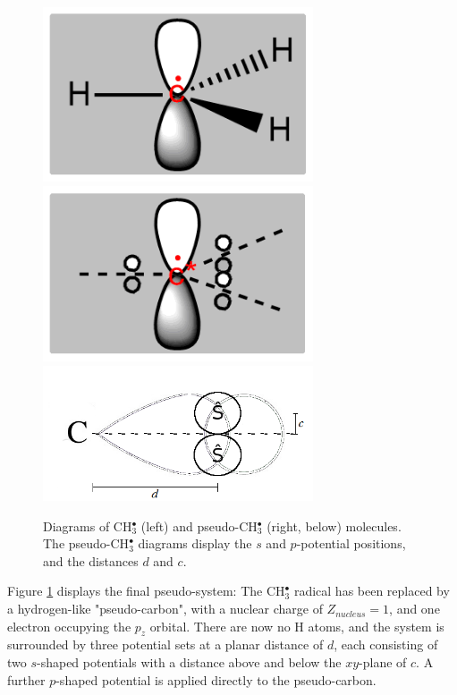 \documentclass[journal=jctcce,manuscript=article]{achemso}
\begin{document}
\begin{figure}[ht]
\includegraphics[width=8cm]{ch3.png}
\includegraphics[width=8cm]{pseudoch3.png}
\includegraphics[width=8cm]{tm_sp2_potentials.png}
\caption{Diagrams of CH\(^{\bullet}_{3}\) (left) and pseudo-CH\(^{\bullet}_{3}\) (right, below) molecules. The pseudo-CH\(^{\bullet}_{3}\) diagrams display the \(s\) and \(p\)-potential positions, and the distances \(d\) and \(c\).}
\label{figure:ref_pseudo_diagram}
\end{figure}

Figure \ref{figure:ref_pseudo_diagram} displays the final pseudo-system: The CH\(^{\bullet}_{3}\) radical has been replaced by
a hydrogen-like "pseudo-carbon", with a nuclear charge of \(Z_{nucleus} = 1\), and one electron occupying the \(p_{z}\) orbital. 
There are now no H atoms, and the system is surrounded by three potential sets at a planar distance of \(d\), each consisting of 
two \(s\)-shaped potentials with a distance above and below the \(xy\)-plane of \(c\). A further \(p\)-shaped potential is applied
directly to the pseudo-carbon.
\end{document}
